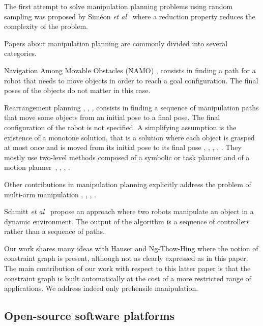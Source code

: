 The first attempt to solve manipulation planning problems using random sampling
was proposed by {\color{blue}Siméon \textit{et al}}~\cite{simeon2004ijrr} where a reduction property reduces the
complexity of the problem.

Papers about manipulation planning are commonly divided into several categories.

Navigation Among Movable Obstacles (NAMO) \cite{wilfong1988motion}, \cite{stilman2008planning} consists in finding
a path for a robot that needs to move objects in order to reach a goal
configuration. The final poses of the objects do not matter in this case.

Rearrangement planning \cite{ota2004rearrangement}, \cite{LIS210},
\cite{KroBek2015}, \cite{LerPha2015} consists in finding a sequence of
manipulation paths that move some objects from an initial pose to a
final pose. The final configuration of the robot is not specified. A
simplifying assumption is the existence of a monotone solution, that is
a solution where each object is grasped at most once and is moved from
its initial pose to its final pose \cite{stilman2008planning},
\cite{stilman2007manipulation}, \cite{srivastavaetal2014icra}, \cite{nieuwenhuisen2008effective},
\cite{ota2004rearrangement}. They mostly use two-level methods
composed of a symbolic or task planner and of a motion
planner~\cite{cambon:hal-01976081}, \cite{KaeLoz2013}, \cite{LozKae2014}, \cite{18-toussaint-RSS}.

Other contributions in manipulation planning explicitly address the problem of multi-arm manipulation \cite{GhaCorSim2009}, \cite{HarTsuLau2014}, \cite{DobBek2015}, \cite{XiaLerPha2017}.

{\color{blue}Schmitt \textit{et al}}~\cite{schmitt19icra} propose an approach where two robots manipulate an object in a dynamic environment. The output of the algorithm is a sequence of controllers rather than a sequence of paths.

Our work shares many ideas with {\color{blue}Hauser and Ng-Thow-Hing} \cite{HauNgt2011} where the notion of constraint
graph is present, although not as clearly expressed as in this paper. The main
contribution of our work with respect to this latter paper is that the
constraint graph is built automatically at the cost of a more restricted range
of applications. We address indeed only prehensile manipulation.

\subsection{Open-source software platforms}

